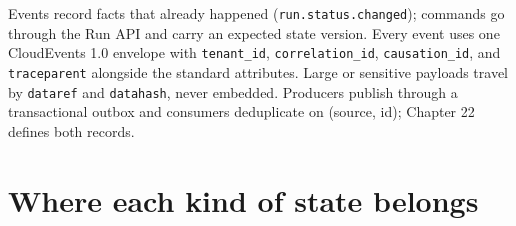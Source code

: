 Events record facts that already happened (\lstinline[style=bookinline]!run.status.changed!); commands go through the Run API and carry an expected state version. Every event uses one CloudEvents 1.0 envelope with \lstinline[style=bookinline]!tenant_id!, \lstinline[style=bookinline]!correlation_id!, \lstinline[style=bookinline]!causation_id!, and \lstinline[style=bookinline]!traceparent! alongside the standard attributes. Large or sensitive payloads travel by \lstinline[style=bookinline]!dataref! and \lstinline[style=bookinline]!datahash!, never embedded. Producers publish through a transactional outbox and consumers deduplicate on (source, id); Chapter 22 defines both records.\par

\section{Where each kind of state belongs}

